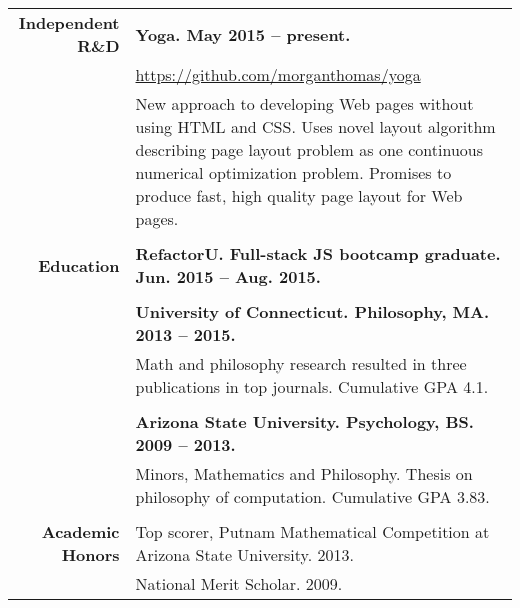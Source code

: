 \documentclass{article}
\begin{document}
\begin{tabular}{rl}
  {\bf Independent R\&D} & {\bf Yoga. May 2015 -- present.} \\ & \href{https://github.com/morganthomas/yoga}{https://github.com/morganthomas/yoga} \\
  & \parbox{4.5in}{New approach to developing Web pages without using HTML and CSS. Uses novel layout algorithm describing page layout problem as one continuous numerical optimization problem. Promises to produce fast, high quality page layout for Web pages.} \\ \\

  {\bf Education} & {\bf RefactorU. Full-stack JS bootcamp graduate. Jun. 2015 -- Aug. 2015.} \\ \\
  & {\bf University of Connecticut. Philosophy, MA. 2013 -- 2015.} \\
  & \parbox{4.5in}{Math and philosophy research resulted in three publications in top journals. Cumulative GPA 4.1.} \\ \\

  & {\bf Arizona State University. Psychology, BS. 2009 -- 2013.} \\
  & \parbox{4.5in}{Minors, Mathematics and Philosophy. Thesis on philosophy of computation. Cumulative GPA 3.83.} \\ \\



  {\bf Academic Honors} & Top scorer, Putnam Mathematical Competition at Arizona State University. 2013. \\
   & National Merit Scholar. 2009.
\end{tabular}
\egroup
\end{document}
